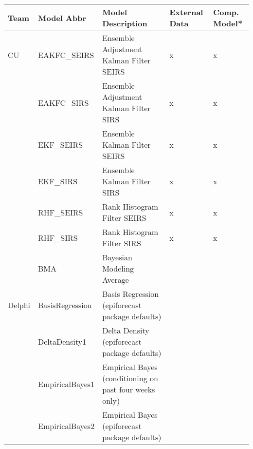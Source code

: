\begin{table}
\setlength{\tabcolsep}{4pt} 
\begin{tabular}{p{1.69cm} l p{7.5cm}  p{1.70cm}  p{1.7cm}}
\hline
Team     & Model Abbr& Model Description & External Data & Comp. Model* \\ 
\hline
CU       & EAKFC\_SEIRS       & Ensemble Adjustment Kalman Filter SEIRS                                                        & x             & x                   \\ 

~        & EAKFC\_SIRS        & Ensemble Adjustment Kalman Filter SIRS                                                         & x             & x                   \\
~        & EKF\_SEIRS         & Ensemble Kalman Filter SEIRS                                                                   & x             & x                   \\
~        & EKF\_SIRS          & Ensemble Kalman Filter SIRS                                                                    & x             & x                   \\
~        & RHF\_SEIRS         & Rank Histogram Filter SEIRS                                                                    & x             & x                   \\
~        & RHF\_SIRS          & Rank Histogram Filter SIRS                                                                     & x             & x                   \\
~        & BMA                & Bayesian Modeling Average                                                                      & ~             & ~                   \\
\hline
Delphi   & BasisRegression    & Basis Regression (epiforecast package defaults)                                                & ~             & ~                   \\ 
~        & DeltaDensity1      & Delta Density (epiforecast package defaults)                                                   & ~             & ~                   \\ 
~        & EmpiricalBayes1    & Empirical Bayes (conditioning on past four weeks only)                                         & ~             & ~                   \\ 
~        & EmpiricalBayes2    & Empirical Bayes (epiforecast package defaults)                                                 & ~             & ~                   \\ 

\end{tabular}
\end{table}
